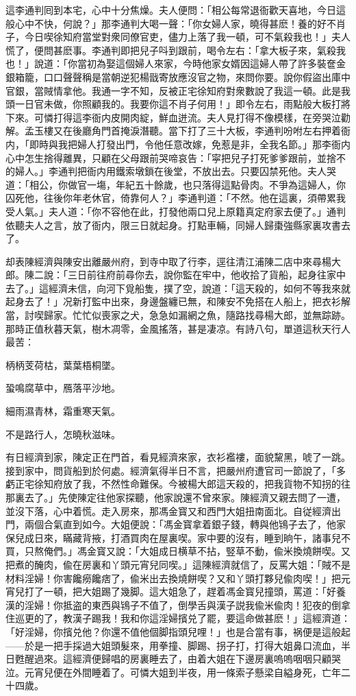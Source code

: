 這李通判囘到本宅，心中十分焦燥。夫人便問：「相公每常退衙歡天喜地，今日這般心中不快，何說？」那李通判大喝一聲：「你女婦人家，曉得甚麽！養的好不肖子，今日喫徐知府當堂對衆同僚官吏，儘力上落了我一頓，可不氣殺我也！」夫人慌了，便問甚麽事。李通判即把兒子呌到跟前，喝令左右：「拿大板子來，氣殺我也！」說道：「你當初為娶這個婦人來家，今時他家女婿因這婦人帶了許多裝奩金銀箱籠，口口聲聲稱是當朝逆犯楊戩寄放應沒官之物，來問你要。說你假盜出庫中官銀，當賊情拿他。我通一字不知，反被正宅徐知府對衆數說了我這一頓。此是我頭一日官未做，你照顧我的。我要你這不肖子何用！」即令左右，雨點般大板打將下來。可憐打得這李衙内皮開肉綻，鮮血迸流。夫人見打得不像模樣，在旁哭泣勸解。孟玉樓又在後廳角門首掩淚潛聽。當下打了三十大板，李通判吩咐左右押着衙内，「即時與我把婦人打發出門，令他任意改嫁，免惹是非，全我名節。」那李衙内心中怎生捨得離異，只顧在父母跟前哭啼哀告：「寜把兒子打死爹爹跟前，並捨不的婦人。」李通判把衙内用鐵索墩鎖在後堂，不放出去。只要囚禁死他。夫人哭道：「相公，你做官一塲，年紀五十餘歲，也只落得這點骨肉。不爭為這婦人，你囚死他，往後你年老休官，倚靠何人？」李通判道：「不然。他在這裏，須帶累我受人氣。」夫人道：「你不容他在此，打發他兩口兒上原籍真定府家去便了。」通判依聽夫人之言，放了衙内，限三日就起身。打點車輛，同婦人歸棗強縣家裏攻書去了。

却表陳經濟與陳安出離嚴州府，到寺中取了行李，逕往清江浦陳二店中來尋楊大郎。陳二說：「三日前往府前尋你去，說你監在牢中，他收拾了貨船，起身往家中去了。」這經濟未信，向河下覓船隻，撲了空，說道：「這天殺的，如何不等我來就起身去了！」况新打監中出來，身邊盤纏已無，和陳安不免搭在人船上，把衣衫解當，討喫歸家。忙忙似喪家之犬，急急如漏網之魚，隨路找尋楊大郎，並無踪跡。那時正值秋暮天氣，樹木凋零，金風搖落，甚是凄凉。有詩八句，單道這秋天行人最苦：

柄柄芰荷枯，葉葉梧桐墜。

蛩鳴腐草中，鴈落平沙地。

細雨濕青林，霜重寒天氣。

不是路行人，怎曉秋滋味。

有日經濟到家，陳定正在門首，看見經濟來家，衣衫襤褸，面貌黧黑，唬了一跳。接到家中，問貨船到於何處。經濟氣得半日不言，把嚴州府遭官司一節說了，「多虧正宅徐知府放了我，不然性命難保。今被楊大郎這天殺的，把我貨物不知拐的往那裏去了。」先使陳定往他家探聽，他家說還不曾來家。陳經濟又親去問了一遭，並沒下落，心中着慌。走入房來，那馮金寳又和西門大姐扭南面北。自従經濟出門，兩個合氣直到如今。大姐便說：「馮金寳拿着銀子錢，轉與他鴇子去了，他家保兒成日來，瞞藏背掖，打酒買肉在屋裏喫。家中要的沒有，睡到晌午，諸事兒不買，只熬俺們。」馮金寳又說：「大姐成日横草不拈，竪草不動，偸米換燒餅喫。又把煮的醃肉，偸在房裏和丫頭元宵兒同喫。」這陳經濟就信了，反罵大姐：「賊不是材料淫婦！你害饞癆饞痞了，偸米出去換燒餅喫？又和丫頭打夥兒偸肉喫！」把元宵兒打了一頓，把大姐踢了幾脚。這大姐急了，趕着馮金寳兒撞頭，罵道：「好養漢的淫婦！你抵盗的東西與鴇子不值了，倒學舌與漢子説我偸米偸肉！犯夜的倒拿住巡更的了，教漢子踢我！我和你這淫婦擯兑了罷，要這命做甚麽！」這經濟道：「好淫婦，你擯兑他？你還不值他個脚指頭兒哩！」也是合當有事，祸便是這般起——於是一把手採過大姐頭髮來，用拳撞、脚踢、拐子打，打得大姐鼻口流血，半日甦醒過來。這經濟便歸唱的房裏睡去了，由着大姐在下邊房裏嗚嗚咽咽只顧哭泣。元宵兒便在外間睡着了。可憐大姐到半夜，用一條索子懸梁自縊身死，亡年二十四歲。

